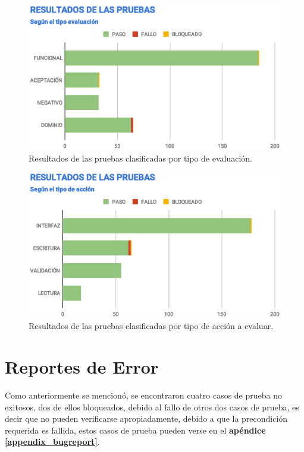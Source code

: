 \begin{figure}[H]
\centering
\includegraphics[width=1.0\textwidth]{graphics/results-tests.eps}
\caption{Resultados de las pruebas clasificadas por tipo de evaluación.}
\label{results-tests}
\end{figure}

\begin{figure}[H]
\centering
\includegraphics[width=1.0\textwidth]{graphics/results-type.eps}
\caption{Resultados de las pruebas clasificadas por tipo de acción a evaluar.}
\label{results-type}
\end{figure}

\section{Reportes de Error}
Como anteriormente se mencionó, se encontraron cuatro casos de prueba no
exitosos, dos de ellos bloqueados, debido al fallo de otros dos casos de
prueba, es decir que no pueden verificarse apropiadamente, debido a que la
precondición requerida es fallida, estos casos de prueba pueden verse en el
\textbf{apéndice \ref{appendix_bugreport}}.

